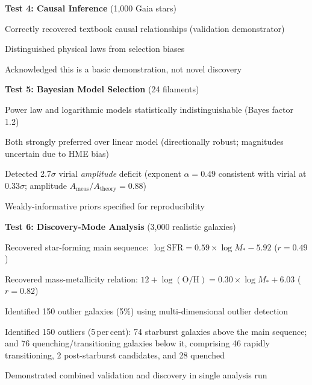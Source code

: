 \documentclass[usenatbib]{rasti}
\begin{document}
\textbf{Test 4: Causal Inference} (1,000 Gaia stars)
\begin{description}
\item Correctly recovered textbook causal relationships (validation demonstrator)
\item Distinguished physical laws from selection biases
\item Acknowledged this is a basic demonstration, not novel discovery
\end{description}

\textbf{Test 5: Bayesian Model Selection} (24 filaments)
\begin{description}
\item Power law and logarithmic models statistically indistinguishable (Bayes factor 1.2)
\item Both strongly preferred over linear model (directionally robust; magnitudes uncertain due to HME bias)
\item Detected 2.7$\sigma$ virial \emph{amplitude} deficit (exponent $\alpha = 0.49$ consistent with virial at $0.33\sigma$; amplitude $A_{\mathrm{meas}}/A_{\mathrm{theory}} = 0.88$)
\item Weakly-informative priors specified for reproducibility
\end{description}

\textbf{Test 6: Discovery-Mode Analysis} (3,000 realistic galaxies)
\begin{description}
\item Recovered star-forming main sequence: $\log \text{SFR} = 0.59 \times \log M_* - 5.92$ ($r = 0.49$)
\item Recovered mass-metallicity relation: $12 + \log(\text{O/H}) = 0.30 \times \log M_* + 6.03$ ($r = 0.82$)
\item Identified 150 outlier galaxies (5\%) using multi-dimensional outlier detection
\item Identified 150 outliers (5\,per\,cent): 74 starburst galaxies above the main sequence; and 76 quenching/transitioning galaxies below it, comprising 46 rapidly transitioning, 2 post-starburst candidates, and 28 quenched
\item Demonstrated combined validation and discovery in single analysis run
\end{description}
\end{document}

